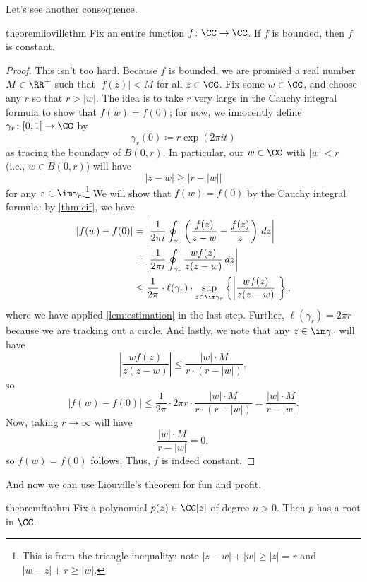 Let's see another consequence.
\begin{restatable}[Liouville's]{theorem}{liovillethm} \label{thm:liouville}
	Fix an entire function $f\colon \CC\to\CC$. If $f$ is bounded, then $f$ is constant.
\end{restatable}
\begin{proof}
	This isn't too hard. Because $f$ is bounded, we are promised a real number $M\in\RR^+$ such that $|f(z)|<M$ for all $z\in\CC$. Fix some $w\in\CC$, and choose any $r$ so that $r>|w|$. The idea is to take $r$ very large in the Cauchy integral formula to show that $f(w)=f(0)$; for now, we innocently define $\gamma_r\colon [0,1]\to\CC$ by
	\[\gamma_r(0)\coloneqq r\exp(2\pi it)\]
	as tracing the boundary of $B(0,r)$. In particular, our $w\in\CC$ with $|w|<r$ (i.e., $w\in B(0,r)$) will have
	\[|z-w|\ge|r-|w||\]
	for any $z\in\im\gamma_r$.\footnote{This is from the triangle inequality: note $|z-w|+|w|\ge|z|=r$ and $|w-z|+r\ge|w|$.} We will show that $f(w)=f(0)$ by the Cauchy integral formula: by \autoref{thm:cif}, we have
	\begin{align*}
		|f(w)-f(0)| &= \left|\frac1{2\pi i}\oint_{\gamma_r}\left(\frac{f(z)}{z-w}-\frac{f(z)}z\right)\,dz\right| \\
		&= \left|\frac1{2\pi i}\oint_{\gamma_r}\frac{wf(z)}{z(z-w)}\,dz\right| \\
		&\le \frac1{2\pi}\cdot\ell(\gamma_r)\cdot\sup_{z\in\im\gamma_r}\left\{\left|\frac{wf(z)}{z(z-w)}\right|\right\},
	\end{align*}
	where we have applied \autoref{lem:estimation} in the last step. Further, $\ell(\gamma_r)=2\pi r$ because we are tracking out a circle. And lastly, we note that any $z\in\im\gamma_r$ will have
	\[\left|\frac{wf(z)}{z(z-w)}\right|\le\frac{|w|\cdot M}{r\cdot(r-|w|)},\]
	so
	\[|f(w)-f(0)|\le\frac1{2\pi}\cdot2\pi r\cdot\frac{|w|\cdot M}{r\cdot(r-|w|)}=\frac{|w|\cdot M}{r-|w|}.\]
	Now, taking $r\to\infty$ will have
	\[\frac{|w|\cdot M}{r-|w|}=0,\]
	so $f(w)=f(0)$ follows. Thus, $f$ is indeed constant.
\end{proof}
And now we can use Liouville's theorem for fun and profit.
\begin{restatable}{theorem}{ftathm}
	Fix a polynomial $p(z)\in\CC[z]$ of degree $n>0$. Then $p$ has a root in $\CC$.
\end{restatable}
